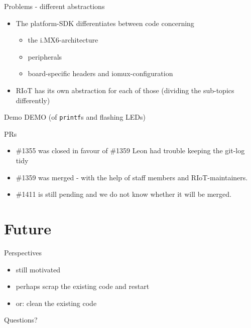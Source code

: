 \documentclass[9pt]{beamer}
\begin{document}
\begin{frame}{Problems - different abstractions}
 \begin{itemize}
\pause
 \item The platform-SDK differentiates between code concerning
\pause
 	\begin{itemize}
 	\item the i.MX6-architecture
\pause
 	\item peripherals
\pause
 	\item board-specific headers and iomux-configuration
\pause
 	\end{itemize}
 \item RIoT has its own abstraction for each of those (dividing the sub-topics differently)
 \end{itemize}
\end{frame}

\begin{frame}{Demo}
DEMO (of \texttt{printf}s and flashing LEDs)
\end{frame}

\begin{frame}{PRs}
 \begin{itemize}
 \item \#1355 was closed in favour of \#1359 \textcolor{light-gray}{Leon had trouble keeping the git-log tidy}
 \item \#1359 was merged - with the help of staff members and RIoT-maintainers.
 \item \#1411 is still pending and we do not know whether it will be merged.
 \end{itemize}
\end{frame}

\section{Future}

\begin{frame}{Perspectives}
 \begin{itemize}
 \item still motivated
 \item perhaps scrap the existing code and restart
 \item or: clean the existing code
 \end{itemize}
\end{frame}

\begin{frame}{Questions?}

\end{frame}
\end{document}

